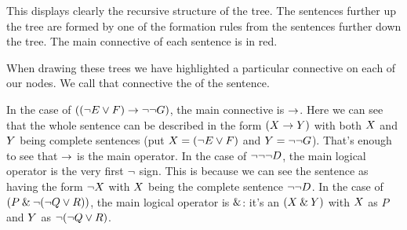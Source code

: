 This displays clearly the recursive structure of the tree. The sentences further up the tree are formed by one of the formation rules from the sentences further down the tree. The main connective of each sentence is in red.


%
%
%
%


When drawing these trees we have highlighted a particular connective on each of our nodes. We call that connective the  of the sentence.


 In the case of $((\neg E \vee F) \rightarrow \neg\neg G)$, the main connective is $\rightarrow$. Here we can see that the whole sentence can be described in the form $(X\rightarrow Y)$ with both $X$ and $Y$ being complete sentences (put $X=(\neg E\vee F)$ and $Y=\neg\neg G$). That's enough to see that $\rightarrow$ is the main operator.
 In the case of $\neg\neg\neg D$, the main logical operator is the very first $\neg$ sign. This is because we can see the sentence as having the form $\neg X$ with $X$ being the complete sentence $\neg\neg D$. In the case of $(P \mathbin{\&} \neg (\neg Q \vee R))$, the main logical operator is $\mathbin{\&}$: it's an $(X\mathbin{\&}Y)$ with $X$ as $P$ and $Y$ as $\neg (\neg Q \vee R)$.

